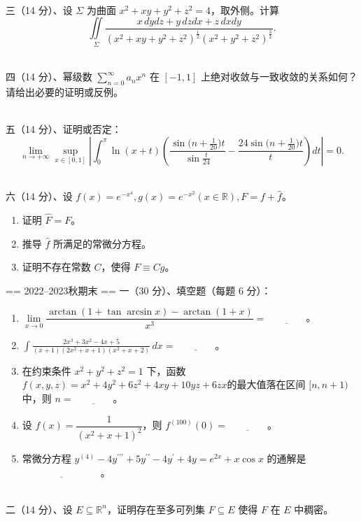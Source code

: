 ~\\
三（14 分）、设 $\Sigma$ 为曲面 $x^{2}+x y+y^{2}+z^{2}=4$，取外侧。计算
$$\iint\limits_{\Sigma} \frac{x \, dy dz+y \, dz dx+z \, dx dy}{(x^{2}+xy+y^{2}+z^{2})^{\frac{1}{2}}(x^{2}+y^{2}+z^{2})^{\frac{3}{2}}}.$$

~\\
四（14 分）、幂级数 $\displaystyle\sum_{n=0}^{\infty} a_{n} x^{n}$ 
在 $[-1,1]$ 上绝对收敛与一致收敛的关系如何？请给出必要的证明或反例。

~\\
五（14 分）、证明或否定：
$$\lim_{n \rightarrow+\infty} \sup_{x \in[0,1]}\left|\int_{0}^{\pi} \ln (x+t)\left(\frac{\sin \big(n+\frac{1}{20}\big) t}{\sin \frac{t}{24}}-\frac{24 \sin \big(n+\frac{1}{20}\big) t}{t}\right) d t\right|=0.$$

~\\
六（14 分）、设 $f(x)=e^{-x^{4}}, g(x)=e^{-x^{2}}(x \in \mathbb{R}), F=f+\widehat{f}$。
\begin{enumerate}[label=(\arabic*)]
\item 证明 $\widehat{F}=F$。
\item 推导 $\widehat{f}$ 所满足的常微分方程。
\item 证明不存在常数 $C$，使得 $F \equiv Cg$。
\end{enumerate}

== 2022--2023秋期末 ==
一（30 分）、填空题（每题 6 分）：
\begin{enumerate}[label=(\arabic*)]
\item $\lim\limits_{x \rightarrow 0} \dfrac{\arctan (1+\tan \arcsin x)-\arctan (1+x)}{x^{3}}=\underline{\qquad\qquad}$。
\item $\displaystyle\int\frac{2x^{3}+3x^{2}-4x+5}{(x+1)(2x^{2}+x+1)(x^{2}+x+2)}\,dx=\underline{\qquad\qquad}$。
\item 在约束条件 $x^{2}+y^{2}+z^{2}=1$ 下，函数 $f(x, y, z)=x^{2}+4y^{2}+6z^{2}+4xy+10yz+6zx$的最大值落在区间 $[n, n+1)$ 中，则 $n=\underline{\qquad\qquad}$。
\item 设 $f(x)=\dfrac{1}{(x^{2}+x+1)^{2}}$，则 $f^{(100)}(0)=\underline{\qquad\qquad}$。
\item 常微分方程 $y^{(4)}-4y^{\prime \prime \prime}+5y^{\prime \prime}-4y^{\prime}+4 y=e^{2x}+x \cos x$ 的通解是 $\underline{\qquad\qquad\qquad\qquad}$。
\end{enumerate}
~\\
二（14 分）、设 $E \subseteq \mathbb{R}^{n}$，证明存在至多可列集 $F \subseteq E$ 使得 $F$ 在 $E$ 中稠密。

